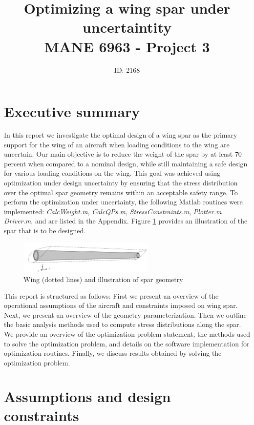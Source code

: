 \documentclass[10pt]{article}
\title{Optimizing a wing spar under uncertaintity \\MANE 6963 - Project 3}
\author{ID: 2168}
\date{}
\begin{document}
\maketitle

\section{Executive summary}

In this report we investigate the optimal design of a
wing spar as the primary support for the wing of an
aircraft when loading conditions to the wing are uncertain.
Our main objective is to reduce the weight of the spar
by at least $70$ percent when compared to a nominal design,
while still maintaining a safe
design for various loading conditions on the wing.
This goal was achieved using optimization under design
uncertainty by ensuring that the stress distribution
over the optimal spar geometry remains within an
acceptable safety range. To perform the optimization
under uncertainty, the following Matlab routines
were implemented: 
\emph{CalcWeight.m}, \emph{CalcQPs.m},
\emph{StressConstraints.m}, \emph{Plotter.m}
\emph{Driver.m},
and are listed in the Appendix.
Figure \ref{fig:spar} provides an illustration of the
spar that is to be designed.

\begin{figure}[hbt]
\centering
\includegraphics[width=0.6\textwidth]{spar}
\caption{Wing (dotted lines) and illustration of spar geometry}
\label{fig:spar}
\end{figure}

This report is structured as follows: First
we present an overview of the operational assumptions
of the aircraft and constraints imposed on wing spar.
Next, we present an overview of the geometry parameterization.
Then we outline the basic analysis methods used to compute
stress distributions along the spar. We provide
an overview of the optimization problem statement, the
methods used to solve the optimization problem, and
details on the software implementation for optimization routines.
Finally, we discuss results obtained by solving the
optimization problem.

\section{Assumptions and design constraints}
\end{document}
